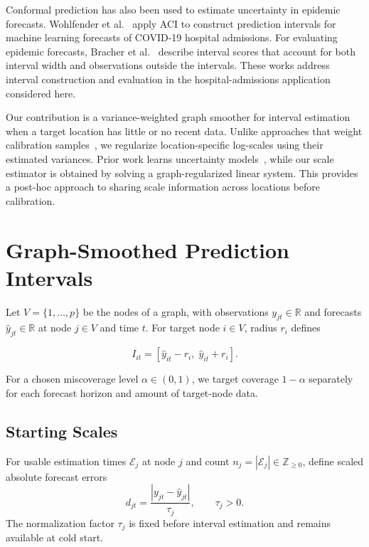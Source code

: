 \documentclass[conference]{IEEEtran}
\begin{document}
Conformal prediction has also been used to estimate uncertainty in epidemic forecasts. Wohlfender et al.~\cite{wohlfender2026hospital} apply ACI to construct prediction intervals for machine learning forecasts of COVID-19 hospital admissions. For evaluating epidemic forecasts, Bracher et al.~\cite{bracher2021evaluating} describe interval scores that account for both interval width and observations outside the intervals. These works address interval construction and evaluation in the hospital-admissions application considered here.

Our contribution is a variance-weighted graph smoother for interval estimation when a target location has little or no recent data. Unlike approaches that weight calibration samples~\cite{baghershahi2026graphlcp}, we regularize location-specific log-scales using their estimated variances. Prior work learns uncertainty models~\cite{cini2025relational,guo2026scale}, while our scale estimator is obtained by solving a graph-regularized linear system. This provides a post-hoc approach to sharing scale information across locations before calibration.

\section{Graph-Smoothed Prediction Intervals}
\label{sec:method}

Let $V=\{1,\ldots,p\}$ be the nodes of a graph, with observations $y_{jt}\in\mathbb R$ and forecasts $\hat y_{jt}\in\mathbb R$ at node $j\in V$ and time $t$. For target node $i\in V$, radius $r_i$ defines

\begin{equation}
I_{it}=[\hat y_{it}-r_i,\;\hat y_{it}+r_i].
\label{eq:prediction-interval}
\end{equation}

For a chosen miscoverage level $\alpha\in(0,1)$, we target coverage $1-\alpha$ separately for each forecast horizon and amount of target-node data.

\subsection{Starting Scales}

For usable estimation times $\mathcal E_j$ at node $j$ and count $n_j=|\mathcal E_j|\in\mathbb Z_{\ge0}$, define scaled absolute forecast errors
\begin{equation}
d_{jt}=\frac{|y_{jt}-\hat y_{jt}|}{\tau_j},\qquad \tau_j>0.
\end{equation}
The normalization factor $\tau_j$ is fixed before interval estimation and remains available at cold start.
\end{document}
